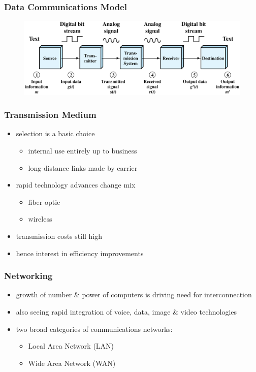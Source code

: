 \documentclass[pdflatex,compress]{beamer}
\begin{document}
\begin{frame}
	\frametitle{Data Communications Model}
	\begin{figure}
		\centering
		\includegraphics[width=\linewidth]{img/img03}
		\label{fig:img03}
	\end{figure}
\end{frame}

\begin{frame}
	\frametitle{Transmission Medium}
	\begin{itemize}
		\item selection is a basic choice
		\begin{itemize}
			\item internal use entirely up to business
			\item long-distance links made by carrier
		\end{itemize}
		\item rapid technology advances change mix
		\begin{itemize}
			\item fiber optic
			\item wireless
		\end{itemize}
		\item transmission costs still high
		\item hence interest in efficiency improvements
	\end{itemize}
\end{frame}

\begin{frame}
	\frametitle{Networking}
	\begin{itemize}
		\item growth of number \& power of computers is driving need for interconnection
		\item also seeing rapid integration of voice, data, image \& video technologies
		\item two broad categories of communications
		networks:
		\begin{itemize}
			\item Local Area Network (LAN)
			\item Wide Area Network (WAN)
		\end{itemize}
	\end{itemize}
\end{frame}
\end{document}
